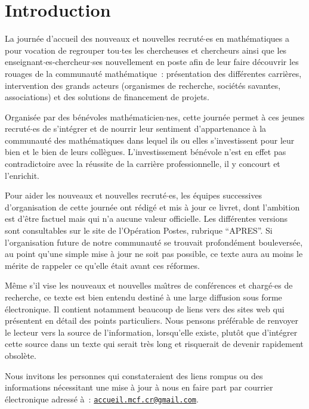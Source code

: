 \documentclass[11pt]{book}
\begin{document}
\setlength{\parskip}{.15cm}

\chapter*{Introduction}

La journ\'ee d'accueil des nouveaux et nouvelles recrut\'e$\cdot$es en math\'ematiques a pour vocation de regrouper
tou$\cdot$tes les chercheuses et chercheurs ainsi que les enseignant$\cdot$es-chercheur$\cdot$ses nouvellement en poste afin de leur faire d\'ecouvrir
les rouages de la communaut\'e math\'ematique~: pr\'esentation des diff\'erentes carri\`eres, 
intervention des grands acteurs (organismes de recherche, soci\'et\'es savantes, associations)
et des solutions de financement de projets. 

Organis\'ee par des b\'en\'evoles math\'ematicien$\cdot$nes, cette journ\'ee permet 
\`a ces jeunes recrut\'e$\cdot$es de s'int\'egrer et de nourrir leur sentiment d'appartenance
\`a la communaut\'e des math\'ematiques dans lequel ils ou elles s'investissent pour leur bien et le bien de leurs coll\`egues.
L'investissement b\'en\'evole n'est en effet pas contradictoire avec la r\'eussite de la carri\`ere professionnelle,
il y concourt et l'enrichit.

Pour aider les nouveaux et nouvelles recrut\'e$\cdot$es, les \'equipes successives d'organisation de cette journ\'ee
ont r\'edig\'e et mis \`a jour ce livret, dont l'ambition est d'\^etre factuel mais qui n'a aucune valeur officielle. 
Les diff\'erentes versions sont consultables sur le site de l'Op\'eration Postes, rubrique ``APRES''. 
Si l'organisation future de notre communaut\'e se trouvait profond\'ement boulevers\'ee,
au point qu'une simple mise \`a jour ne soit pas
possible, ce texte aura au moins le m\'erite de rappeler
ce qu'elle \'etait avant ces r\'eformes.

M\^eme s'il vise les nouveaux et nouvelles ma\^\i  tres de conf\'erences et
charg\'e$\cdot$es de recherche, ce texte est bien entendu destin\'e \`a une
large diffusion sous forme \'electronique. Il contient notamment
beaucoup de liens vers des sites web qui pr\'esentent en d\'etail
des points particuliers. Nous pensons pr\'ef\'erable de renvoyer le
lecteur vers la source de l'information, lorsqu'elle existe,
plut\^ot que d'int\'egrer cette source dans un texte qui serait tr\`es long et
risquerait de devenir rapidement obsol\`ete.

Nous invitons les personnes qui constateraient des liens rompus ou
des informations n\'eces\-si\-tant une mise \`a jour \`a nous en
faire part par courrier \'electronique adress\'e \`a~:
\href{mailto:accueil.mcf.cr@gmail.com}{\texttt{accueil.mcf.cr@gmail.com}}.
\end{document}

